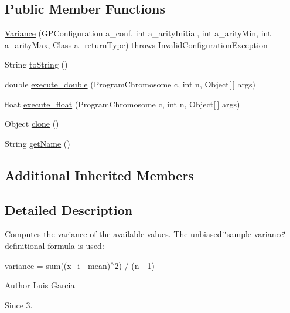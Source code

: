 \subsection*{Public Member Functions}
\begin{DoxyCompactItemize}
\item 
\hyperlink{classorg_1_1jgap_1_1gp_1_1function_1_1statistics_1_1_variance_a9cdc1735265b6054a34e5b5ba6bfb230}{Variance} (G\-P\-Configuration a\-\_\-conf, int a\-\_\-arity\-Initial, int a\-\_\-arity\-Min, int a\-\_\-arity\-Max, Class a\-\_\-return\-Type)  throws Invalid\-Configuration\-Exception 
\item 
String \hyperlink{classorg_1_1jgap_1_1gp_1_1function_1_1statistics_1_1_variance_a16d9a59025cb874c9fefd34c907919e4}{to\-String} ()
\item 
double \hyperlink{classorg_1_1jgap_1_1gp_1_1function_1_1statistics_1_1_variance_a30cf8bb80ab8225ce096237f5054c168}{execute\-\_\-double} (Program\-Chromosome c, int n, Object\mbox{[}$\,$\mbox{]} args)
\item 
float \hyperlink{classorg_1_1jgap_1_1gp_1_1function_1_1statistics_1_1_variance_a86e67cf66e958d45b51ef526572d1fec}{execute\-\_\-float} (Program\-Chromosome c, int n, Object\mbox{[}$\,$\mbox{]} args)
\item 
Object \hyperlink{classorg_1_1jgap_1_1gp_1_1function_1_1statistics_1_1_variance_a956dca7eb2eed283585af297868a881a}{clone} ()
\item 
String \hyperlink{classorg_1_1jgap_1_1gp_1_1function_1_1statistics_1_1_variance_a7c2d948932aebae13c82b8e9cb3cd299}{get\-Name} ()
\end{DoxyCompactItemize}
\subsection*{Additional Inherited Members}


\subsection{Detailed Description}
Computes the variance of the available values. The unbiased \char`\"{}sample variance\char`\"{} definitional formula is used\-: 

variance = sum((x\-\_\-i -\/ mean)$^\wedge$2) / (n -\/ 1) 

\begin{DoxyAuthor}{Author}
Luis Garcia 
\end{DoxyAuthor}
\begin{DoxySince}{Since}
3. 
\end{DoxySince}


